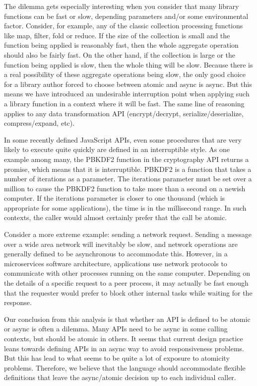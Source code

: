 \documentclass[sigplan,10pt,review,anonymous]{acmart}\settopmatter{printfolios=true,printccs=false,printacmref=false}
\begin{document}
The dilemma gets especially interesting when you consider that many library functions can be fast or slow, depending parameters and/or some environmental factor.
Consider, for example, any of the classic collection processing functions like map, filter, fold or reduce.
If the size of the collection is small and the function being applied is reasonably fast, then the whole aggregate operation should also be fairly fast.
On the other hand, if the collection is large or the function being applied is slow, then the whole thing will be slow.
Because there is a real possibility of these aggregate operations being slow, the only good choice for a library author forced to choose between atomic and async is async.
But this means we have introduced an undesirable interruption point when applying such a library function in a context where it will be fast.
The same line of reasoning applies to any data transformation API (encrypt/decrypt, serialize/deserialize, compress/expand, etc).

In some recently defined JavaScript APIs, even some procedures that are very likely to execute quite quickly are defined in an interruptible style.
As one example among many, the PBKDF2 function in the cryptography API returns a promise, which means that it is interruptible.
PBKDF2 is a function that takes a number of iterations as a parameter.
The iterations parameter must be set over a million to cause the PBKDF2 function to take more than a second on a newish computer.
If the iterations parameter is closer to one thousand (which is appropriate for some applications), the time is in the millisecond range.
In such contexts, the caller would almost certainly prefer that the call be atomic.

Consider a more extreme example: sending a network request.
Sending a message over a wide area network will inevitably be slow, and network operations are generally defined to be asynchronous to accommodate this.
However, in a microservices software architecture, applications use network protocols to communicate with other processes running on the same computer.
Depending on the details of a specific request to a peer process, it may actually be fast enough that the requester would prefer to block other internal tasks while waiting for the response.

Our conclusion from this analysis is that whether an API is defined to be atomic or async is often a dilemma.
Many APIs need to be async in some calling contexts, but should be atomic in others.
It seems that current design practice leans towards defining APIs in an async way to avoid responsiveness problems.
But this has lead to what seems to be quite a lot of exposure to atomicity problems.
Therefore, we believe that the language should accommodate flexible definitions that leave the async/atomic decision up to each individual caller.
\end{document}
